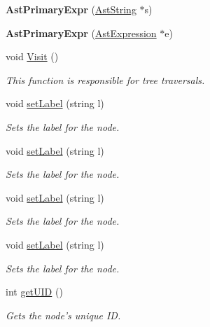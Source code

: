 \begin{DoxyCompactItemize}
\item 
\hypertarget{classAstPrimaryExpr_a784c92261d262fe4952963af0dd891e7}{{\bfseries Ast\-Primary\-Expr} (\hyperlink{classAstString}{Ast\-String} $\ast$s)}\label{classAstPrimaryExpr_a784c92261d262fe4952963af0dd891e7}

\item 
\hypertarget{classAstPrimaryExpr_a75b1363ac6a376ea3de63e03700072d8}{{\bfseries Ast\-Primary\-Expr} (\hyperlink{classAstExpression}{Ast\-Expression} $\ast$e)}\label{classAstPrimaryExpr_a75b1363ac6a376ea3de63e03700072d8}

\item 
void \hyperlink{classAstPrimaryExpr_adfc316933183cada2963b7b855ddb824}{Visit} ()
\begin{DoxyCompactList}\small\item\em This function is responsible for tree traversals. \end{DoxyCompactList}\item 
void \hyperlink{classAST_a71d680856e95ff89f55d5311a552eba6}{set\-Label} (string l)
\begin{DoxyCompactList}\small\item\em Sets the label for the node. \end{DoxyCompactList}\item 
void \hyperlink{classAST_a71d680856e95ff89f55d5311a552eba6}{set\-Label} (string l)
\begin{DoxyCompactList}\small\item\em Sets the label for the node. \end{DoxyCompactList}\item 
void \hyperlink{classAST_a71d680856e95ff89f55d5311a552eba6}{set\-Label} (string l)
\begin{DoxyCompactList}\small\item\em Sets the label for the node. \end{DoxyCompactList}\item 
void \hyperlink{classAST_a71d680856e95ff89f55d5311a552eba6}{set\-Label} (string l)
\begin{DoxyCompactList}\small\item\em Sets the label for the node. \end{DoxyCompactList}\item 
int \hyperlink{classAST_ab7a5b1d9f1c2de0d98deb356f724a42c}{get\-U\-I\-D} ()
\begin{DoxyCompactList}\small\item\em Gets the node's unique I\-D. \end{DoxyCompactList}\item 

\end{DoxyCompactItemize}
